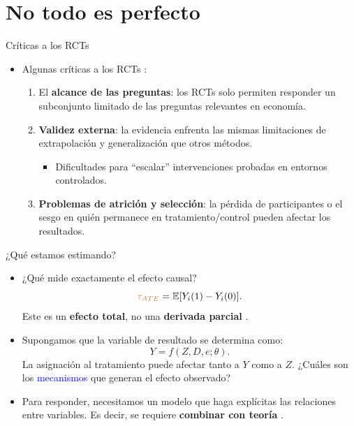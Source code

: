 \documentclass[10pt, xcolor=dvipsnames]{beamer}
\begin{document}
\section{No todo es perfecto}

\begin{frame}{Críticas a los RCTs}
\begin{itemize}
    \item Algunas críticas a los RCTs \citep{deaton2018understanding}: 
    \vspace{1em}
    \begin{enumerate}
        \item El \textbf{alcance de las preguntas}: los RCTs solo permiten responder un subconjunto limitado de las preguntas relevantes en economía. 
        \vspace{1em}
        \item \textbf{Validez externa}: la evidencia enfrenta las mismas limitaciones de extrapolación y generalización que otros métodos.
        \begin{itemize}
            \item Dificultades para ``escalar'' intervenciones probadas en entornos controlados. 
        \end{itemize}
        \vspace{1em}
        \item \textbf{Problemas de atrición y selección}: la pérdida de participantes o el sesgo en quién permanece en tratamiento/control pueden afectar los resultados.
    \end{enumerate}
\end{itemize}
\end{frame}


\begin{frame}{¿Qué estamos estimando?}
\begin{itemize}
    \item ¿Qué mide exactamente el efecto causal? 
    \[
        \textcolor{brown}{\tau_{ATE}} = \operatorname{\mathbb{E}}[Y_i(1) - Y_i(0)].
    \]
    Este es un \textbf{efecto total}, no una \textbf{derivada parcial} \citep{Duflo2007}. 
    \item Supongamos que la variable de resultado se determina como:
    \[
        Y = f(Z, D, e; \theta).
    \]
    La asignación al tratamiento puede afectar tanto a \(Y\) como a \(Z\). ¿Cuáles son los \textcolor{blue}{mecanismos} que generan el efecto observado? 
    \smallspace
    \item Para responder, necesitamos un modelo que haga explícitas las relaciones entre variables. Es decir, se requiere \textbf{combinar con teoría} \citep{Keane2010, Andrews23}.
\end{itemize}
\end{frame}

\end{document}
